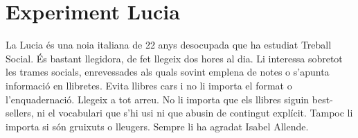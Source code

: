 
\section{Experiment Lucia}

La Lucia és una noia italiana de 22 anys desocupada que ha estudiat Treball Social. És bastant llegidora, de fet llegeix dos hores al dia. Li interessa sobretot les trames socials, enrevessades als quals sovint emplena de notes o s'apunta informació en llibretes. Evita llibres cars i no li importa el format o l'enquadernació. Llegeix a tot arreu. No li importa que els llibres siguin best-sellers, ni el vocabulari que s'hi usi ni que abusin de contingut explícit. Tampoc li importa si són gruixuts o lleugers. Sempre li ha agradat Isabel Allende.

